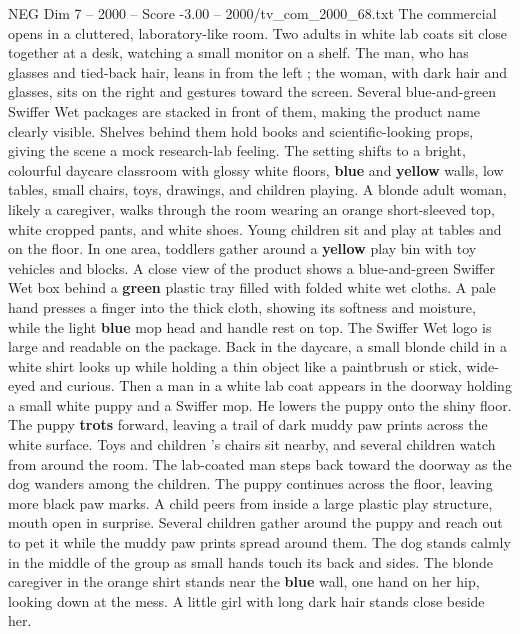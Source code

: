 \begin{textsample}{NEG Dim 7 – 2000 – Score -3.00 – 2000/tv\_com\_2000\_68.txt}  \label{ex:f7_neg_028}
The commercial opens in a cluttered, laboratory-like room.
Two adults in white lab coats sit close together at a desk, watching a small monitor on a shelf.
The man, who has glasses and tied-back hair, leans in from the left ; the woman, with dark hair and glasses, sits on the right and gestures toward the screen.
Several blue-and-green Swiffer Wet packages are stacked in front of them, making the product name clearly visible.
Shelves behind them hold books and scientific-looking props, giving the scene a mock research-lab feeling.
The setting shifts to a bright, colourful daycare classroom with glossy white floors, \textbf{blue} and \textbf{yellow} walls, low tables, small chairs, toys, drawings, and children playing.
A blonde adult woman, likely a caregiver, walks through the room wearing an orange short-sleeved top, white cropped pants, and white shoes.
Young children sit and play at tables and on the floor.
In one area, toddlers gather around a \textbf{yellow} play bin with toy vehicles and blocks.
A close view of the product shows a blue-and-green Swiffer Wet box behind a \textbf{green} plastic tray filled with folded white wet cloths.
A pale hand presses a finger into the thick cloth, showing its softness and moisture, while the light \textbf{blue} mop head and handle rest on top.
The Swiffer Wet logo is large and readable on the package.
Back in the daycare, a small blonde child in a white shirt looks up while holding a thin object like a paintbrush or stick, wide-eyed and curious.
Then a man in a white lab coat appears in the doorway holding a small white puppy and a Swiffer mop.
He lowers the puppy onto the shiny floor.
The puppy \textbf{trots} forward, leaving a trail of dark muddy paw prints across the white surface.
Toys and children ’s chairs sit nearby, and several children watch from around the room.
The lab-coated man steps back toward the doorway as the dog wanders among the children.
The puppy continues across the floor, leaving more black paw marks.
A child peers from inside a large plastic play structure, mouth open in surprise.
Several children gather around the puppy and reach out to pet it while the muddy paw prints spread around them.
The dog stands calmly in the middle of the group as small hands touch its back and sides.
The blonde caregiver in the orange shirt stands near the \textbf{blue} wall, one hand on her hip, looking down at the mess.
A little girl with long dark hair stands close beside her.

\end{textsample}
